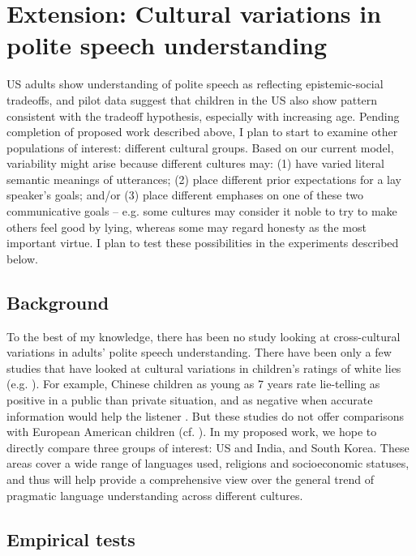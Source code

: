 \section{Extension: Cultural variations in polite speech understanding}
\label{sec:culture}

US adults show understanding of polite speech as reflecting epistemic-social tradeoffs, and pilot data suggest that children in the US also show pattern consistent with the tradeoff hypothesis, especially with increasing age. Pending completion of proposed work described above, I plan to start to examine other populations of interest: different cultural groups. Based on our current model, variability might arise because different cultures may: (1) have varied literal semantic meanings of utterances; (2) place different prior expectations for a lay speaker's goals; and/or (3) place different emphases on one of these two communicative goals -- e.g. some cultures may consider it noble to try to make others feel good by lying, whereas some may regard honesty as the most important virtue. I plan to test these possibilities in the experiments described below. 

\subsection{Background} 

To the best of my knowledge, there has been no study looking at cross-cultural variations in adults' polite speech understanding. There have been only a few studies that have looked at cultural variations in children's ratings of white lies (e.g. \citealt{fu2007, ma2011}). For example, Chinese children as young as 7 years rate lie-telling as positive in a public than private situation, and as negative when accurate information would help the listener \citep{ma2011}. But these studies do not offer comparisons with European American children (cf. \citealt{lee1997}). In my proposed work, we hope to directly compare three groups of interest: US and India, and South Korea. These areas cover a wide range of languages used, religions and socioeconomic statuses, and thus will help provide a comprehensive view over the general trend of pragmatic language understanding across different cultures.

\subsection{Empirical tests}

